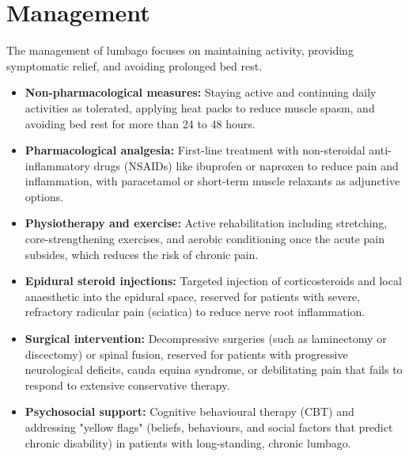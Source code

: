 \section*{Management}
The management of lumbago focuses on maintaining activity, providing symptomatic relief, and avoiding prolonged bed rest.
\begin{itemize}
    \item \textbf{Non-pharmacological measures:} Staying active and continuing daily activities as tolerated, applying heat packs to reduce muscle spasm, and avoiding bed rest for more than 24 to 48 hours.
    \item \textbf{Pharmacological analgesia:} First-line treatment with non-steroidal anti-inflammatory drugs (NSAIDs) like ibuprofen or naproxen to reduce pain and inflammation, with paracetamol or short-term muscle relaxants as adjunctive options.
    \item \textbf{Physiotherapy and exercise:} Active rehabilitation including stretching, core-strengthening exercises, and aerobic conditioning once the acute pain subsides, which reduces the risk of chronic pain.
    \item \textbf{Epidural steroid injections:} Targeted injection of corticosteroids and local anaesthetic into the epidural space, reserved for patients with severe, refractory radicular pain (sciatica) to reduce nerve root inflammation.
    \item \textbf{Surgical intervention:} Decompressive surgeries (such as laminectomy or discectomy) or spinal fusion, reserved for patients with progressive neurological deficits, cauda equina syndrome, or debilitating pain that fails to respond to extensive conservative therapy.
    \item \textbf{Psychosocial support:} Cognitive behavioural therapy (CBT) and addressing "yellow flags" (beliefs, behaviours, and social factors that predict chronic disability) in patients with long-standing, chronic lumbago.
\end{itemize}

